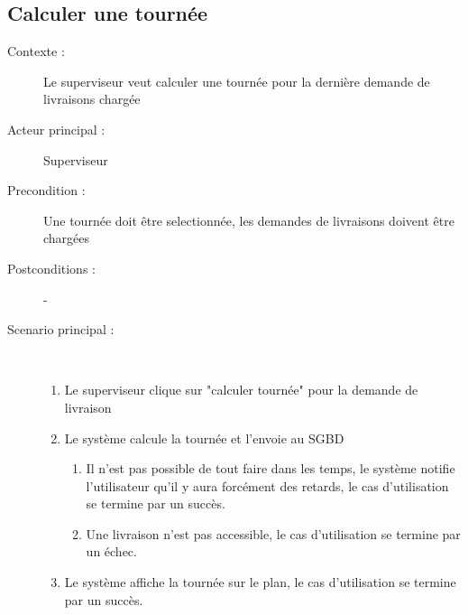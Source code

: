 \subsection{Calculer une tourn\'ee}
\begin{description}
    \item[Contexte :] Le superviseur veut calculer une tourn\'ee pour la derni\`ere demande de livraisons charg\'ee
    \item[Acteur principal :] Superviseur
    \item[Precondition :] Une tourn\'ee doit \^etre selectionn\'ee, les demandes de livraisons doivent \^etre charg\'ees
    \item[Postconditions :] -
    \item[Scenario principal :] ~
    \begin{enumerate}
        \item Le superviseur clique sur "calculer tourn\'ee" pour la demande de livraison
        \item Le syst\`eme calcule la tourn\'ee et l'envoie au SGBD
        \begin{enumerate}
            \item Il n'est pas possible de tout faire dans les temps, le syst\`eme notifie l'utilisateur qu'il y aura forc\'ement des retards, le cas d'utilisation se termine par un succ\`es.
            \item Une livraison n'est pas accessible, le cas d'utilisation se termine par un \'echec.
        \end{enumerate}
        \item Le syst\`eme affiche la tourn\'ee sur le plan, le cas d'utilisation se termine par un succ\`es.
    \end{enumerate}
\end{description}
\pagebreak

